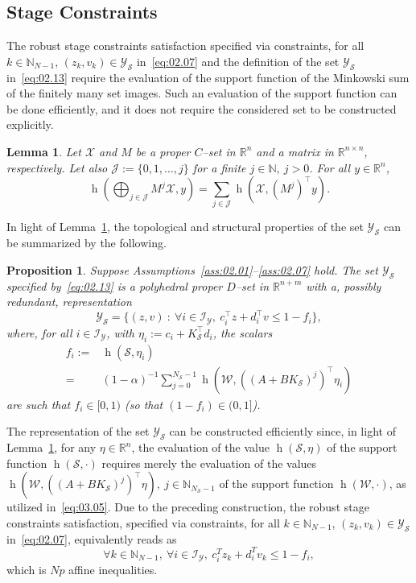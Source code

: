 \documentclass[twocolumn]{autart}
\newtheorem{proposition}{Proposition}
\newtheorem{lemma}{Lemma}
\newcommand{\mb}[1]{\mathbb{#1}}
\newcommand{\mc}[1]{\mathcal{#1}}
\newcommand{\N}{\mb{N}}
\newcommand{\R}{\mb{R}}
\newcommand{\Rnm}[2]{\R^{{#1}\times{#2}}}
\newcommand{\support}[2]{\operatorname{h}(#1,#2)}
\newcommand{\supportbb}[1]{\operatorname{h}(#1,\cdot)}
\numberwithin{equation}{section}
\begin{document}
\subsection{Stage Constraints}
\label{sec:03.04}

The robust stage constraints satisfaction specified via constraints, for all $k\in\N_{N-1}$, $(z_k,v_k)\in\mc{Y}_\mc{S}$ in~\eqref{eq:02.07} and the definition of the set $\mc{Y}_\mc{S}$ in~\eqref{eq:02.13} require the evaluation of the support function of the Minkowski sum of the finitely many set images. Such an evaluation of the support function can be done efficiently, and it does not require the considered set to be constructed explicitly.
\begin{lemma}
\label{lemma:03.02}
Let $\mc{X}$ and $M$ be a proper $C$--set in $\R^n$ and a matrix in $\Rnm{n}{n}$, respectively. Let also $\mc{J}:=\{0,1,\ldots,j\}$ for a finite  $j\in\N,\ j>0$.  For all $y\in\R^n$,
\begin{equation*}
\support{\bigoplus_{j\in\mc{J}} M^j\mc{X}}{y}=\sum_{j\in\mc{J}}\support{\mc{X}}{(M^j)^\top y}.
\end{equation*}
\end{lemma}
In light of Lemma~\ref{lemma:03.02}, the topological and structural properties of the set $\mc{Y}_\mc{S}$ can be summarized by the following. 
\begin{proposition}
\label{prop:03.01}
Suppose Assumptions~\ref{ass:02.01}--\ref{ass:02.07} hold. The set $\mc{Y}_\mc{S}$ specified by~\eqref{eq:02.13} is a polyhedral proper $D$--set in $\R^{n+m}$ with a, possibly redundant, representation
\begin{equation}
\label{eq:03.04}
\mc{Y}_\mc{S}=\{(z,v)\ :\ \forall i\in\mc{I}_\mc{Y},\  c_i^\top z + d_i^\top v \le 1-f_i\},
\end{equation}
where, for all $i\in\mc{I}_\mc{Y}$, with $\eta_i:=c_i+K_\mc{S}^\top d_i$, the scalars
\begin{align}
f_i:=&\support{\mc{S}}{\eta_i}
\nonumber\\
\label{eq:03.05}
=&(1-\alpha)^{-1}\sum_{j=0}^{N_\mc{S}-1}\support{\mc{W}}{((A+BK_\mc{S})^j)^\top \eta_i}
\end{align}
are such that $f_i\in [0,1)$ (so that $(1-f_i)\in (0,1]$).
\end{proposition}
The representation of the set $\mc{Y}_\mc{S}$ can be constructed efficiently since, in light of Lemma~\ref{lemma:03.02}, for any $\eta\in\R^n$, the evaluation of the value  $\support{\mc{S}}{\eta}$ of the support function $\supportbb{\mc{S}}$  requires merely the evaluation of the values $\support{\mc{W}}{((A+BK_\mc{S})^j)^\top \eta},\ j\in\N_{N_\mc{S}-1}$ of the support function $\supportbb{\mc{W}}$, as utilized in~\eqref{eq:03.05}. 
Due to the preceding construction, the robust stage constraints satisfaction, specified via constraints, for all $k\in\N_{N-1}$, $(z_k,v_k)\in\mc{Y}_\mc{S}$ in~\eqref{eq:02.07}, equivalently reads as
\begin{equation}
\label{eq:03.06}
\forall k\in\N_{N-1},\  \forall i\in\mc{I}_\mc{Y},\  c_i^Tz_k+d_i^Tv_k\le 1-f_i,
\end{equation}
which is $Np$ affine inequalities.
\end{document}
